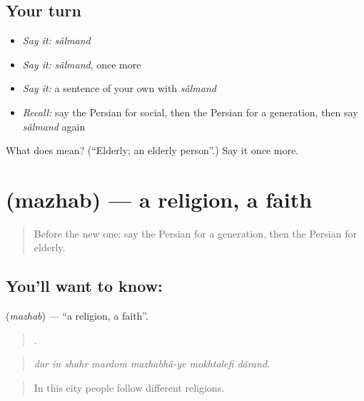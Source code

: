 \subsection*{Your turn}
\begin{itemize}
\raggedright
  \item \emph{Say it:} \emph{sâlmand}
  \item \emph{Say it:} \emph{sâlmand}, once more
  \item \emph{Say it:} a sentence of your own with \emph{sâlmand}
  \item \emph{Recall:} say the Persian for social, then the Persian for a generation, then say \emph{sâlmand} again
\end{itemize}

\begin{tcolorbox}[breakable,colback=teal!4,colframe=teal!35!black,title={Before you move on}]
What does  mean? (\textquotedblleft{}Elderly; an elderly person\textquotedblright{}.) Say it once more.
\end{tcolorbox}
\section[\texorpdfstring{\fa{مذهب} (mazhab)}{مذهب (mazhab)}]{ (mazhab) — a religion, a faith}

\label{lesson:FA-C385-mazhab}



\begin{quote}
Before the new one: say the Persian for a generation, then the Persian for elderly.
\end{quote}

\subsection*{You'll want to know: }
\textbf{} (\emph{mazhab}) — \textquotedblleft{}a religion, a faith\textquotedblright{}.

\begin{quote}
      .
\end{quote}

\begin{quote}
\emph{dar in shahr mardom mazhabhâ-ye mokhtalefi dârand.}
\end{quote}

\begin{quote}
In this city people follow different religions.
\end{quote}


